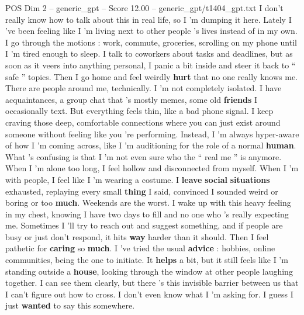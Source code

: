 \begin{textsample}{POS Dim 2 – generic\_gpt – Score 12.00 – generic\_gpt/t1404\_gpt.txt}  \label{ex:f2_pos_031}
I don't really know how to talk about this in real life, so I ’m dumping it here.
Lately I ’ve been feeling like I ’m living next to other people ’s lives instead of in my own.
I go through the motions : work, commute, groceries, scrolling on my phone until I ’m tired enough to sleep.
I talk to coworkers about tasks and deadlines, but as soon as it veers into anything personal, I panic a bit inside and steer it back to “ safe ” topics.
Then I go home and feel weirdly \textbf{hurt} that no one really knows me.
There are people around me, technically.
I ’m not completely isolated.
I have acquaintances, a group chat that ’s mostly memes, some old \textbf{friends} I occasionally text.
But everything feels thin, like a bad phone signal.
I keep craving those deep, comfortable connections where you can just exist around someone without feeling like you ’re performing.
Instead, I ’m always hyper-aware of how I ’m coming across, like I ’m auditioning for the role of a normal \textbf{human}.
What ’s confusing is that I ’m not even sure who the “ real me ” is anymore.
When I ’m alone too long, I feel hollow and disconnected from myself.
When I ’m with people, I feel like I ’m wearing a costume.
I \textbf{leave} \textbf{social} \textbf{situations} exhausted, replaying every small \textbf{thing} I said, convinced I sounded weird or boring or too \textbf{much}.
Weekends are the worst.
I wake up with this heavy feeling in my chest, knowing I have two days to fill and no one who ’s really expecting me.
Sometimes I ’ll try to reach out and suggest something, and if people are busy or just don't respond, it hits \textbf{way} harder than it should.
Then I feel pathetic for \textbf{caring} so \textbf{much}.
I ’ve tried the usual \textbf{advice} : hobbies, online communities, being the one to initiate.
It \textbf{helps} a bit, but it still feels like I ’m standing outside a \textbf{house}, looking through the window at other people laughing together.
I can see them clearly, but there ’s this invisible barrier between us that I can't figure out how to cross.
I don't even know what I ’m asking for.
I guess I just \textbf{wanted} to say this somewhere.

\end{textsample}
